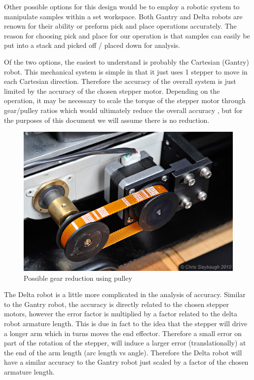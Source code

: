 \documentclass[11pt]{article}
\begin{document}

Other possible options for this design would be to employ a robotic system to manipulate samples within a set workspace. Both Gantry and Delta robots are renown for their ability or preform pick and place operations accurately. The reason for choosing pick and place for our operation is that samples can easily be put into a stack and picked off / placed down for analysis. 

Of the two options, the easiest to understand is probably the Cartesian (Gantry) robot. This mechanical system is simple in that it just uses 1 stepper to move in each Cartesian direction. Therefore the accuracy of the overall system is just limited by the accuracy of the chosen stepper motor. Depending on the operation, it may be necessary to scale the torque of the stepper motor through gear/pulley ratios which would ultimately reduce the overall accuracy \cite{Stepper_Pulley}, but for the purposes of this document we will assume there is no reduction. 

    \begin{figure}[H]
        \centering
        \includegraphics[width = .5\textwidth]{Stepper_pulley.jpg}
        \caption{Possible gear reduction using pulley}
        \label{fig:forward_kin}
    \end{figure}

The Delta robot is a little more complicated in the analysis of accuracy. Similar to the Gantry robot, the accuracy is directly related to the chosen stepper motors, however the error factor is multiplied by a factor related to the delta robot armature length. This is due in fact to the idea that the stepper will drive a longer arm which in turns moves the end effector. Therefore a small error on part of the rotation of the stepper, will induce a larger error (translationally) at the end of the arm length (arc length vs angle). Therefore the Delta robot will have a similar accuracy to the Gantry robot just scaled by a factor of the chosen armature length. 
\end{document}
